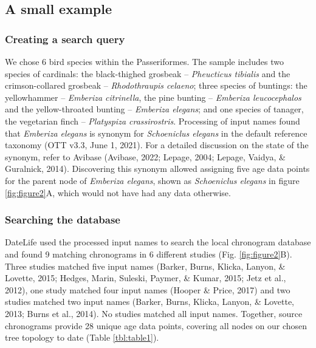 \documentclass[english,man]{apa6}
\begin{document}
\hypertarget{a-small-example}{%
\subsection{A small example}\label{a-small-example}}

\hypertarget{creating-a-search-query-1}{%
\subsubsection{Creating a search query}\label{creating-a-search-query-1}}

We chose 6 bird species within the Passeriformes. The sample includes
two species of cardinals:
the black-thighed grosbeak -- \emph{Pheucticus tibialis} and
the crimson-collared grosbeak -- \emph{Rhodothraupis celaeno};
three species of buntings:
the yellowhammer -- \emph{Emberiza citrinella},
the pine bunting -- \emph{Emberiza leucocephalos} and
the yellow-throated bunting -- \emph{Emberiza elegans};
and one species of tanager, the vegetarian finch -- \emph{Platyspiza crassirostris}.
Processing of input names found that \emph{Emberiza elegans} is synonym for \emph{Schoeniclus elegans} in the default reference taxonomy (OTT v3.3, June 1, 2021). For a detailed discussion on the state of the synonym, refer to Avibase (Avibase, 2022; Lepage, 2004; Lepage, Vaidya, \& Guralnick, 2014).
Discovering this synonym allowed assigning five age data points for the parent node of \emph{Emberiza elegans}, shown as \emph{Schoeniclus elegans} in figure \ref{fig:figure2}A, which would not have had any data otherwise.

\hypertarget{searching-the-database}{%
\subsubsection{Searching the database}\label{searching-the-database}}

DateLife used the processed input names to search the local chronogram database and found 9 matching chronograms in 6 different studies (Fig. \ref{fig:figure2}B). Three studies matched five input names (Barker, Burns, Klicka, Lanyon, \& Lovette, 2015; Hedges, Marin, Suleski, Paymer, \& Kumar, 2015; Jetz et al., 2012), one study matched four input names (Hooper \& Price, 2017) and two studies matched two input names (Barker, Burns, Klicka, Lanyon, \& Lovette, 2013; Burns et al., 2014). No studies matched all input names. Together, source chronograms provide 28 unique age data points, covering all nodes on our chosen tree topology to date (Table \ref{tbl:table1}).
\end{document}
